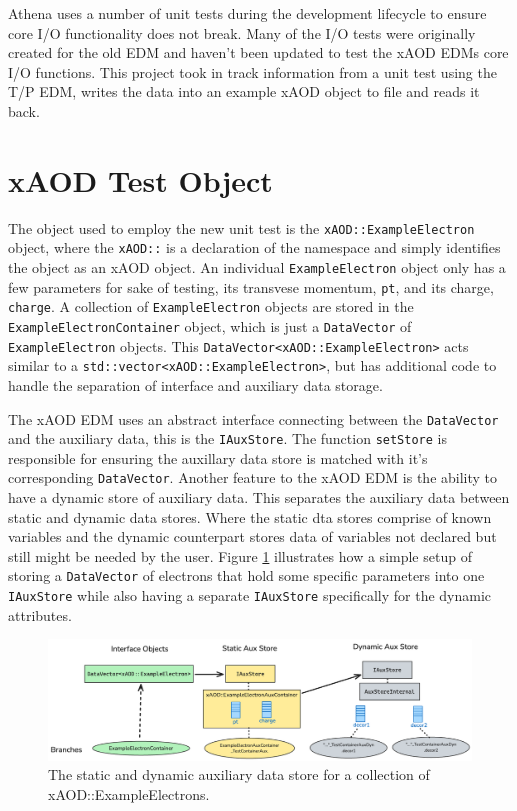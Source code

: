 Athena uses a number of unit tests during the development lifecycle to ensure core I/O functionality does not break.
Many of the I/O tests were originally created for the old EDM and haven't been updated to test the xAOD EDMs core I/O functions.
This project took in track information from a unit test using the T/P EDM, writes the data into an example xAOD object to file and reads it back.


\section{xAOD Test Object}
\label{sec:Mod_utests_xAOD_object}

The object used to employ the new unit test is the \verb|xAOD::ExampleElectron| object, where the \verb|xAOD::| is a declaration of the namespace and simply identifies the object as an xAOD object.
An individual \verb|ExampleElectron| object only has a few parameters for sake of testing, its transvese momentum, \verb|pt|, and its charge, \verb|charge|.
A collection of \verb|ExampleElectron| objects are stored in the \verb|ExampleElectronContainer| object, which is just a \verb|DataVector| of \verb|ExampleElectron| objects.\cite{Buckley_2015}
This \verb|DataVector<xAOD::ExampleElectron>| acts similar to a \verb|std::vector<xAOD::ExampleElectron>|, but has additional code to handle the separation of interface and auxiliary data storage. 

The xAOD EDM uses an abstract interface connecting between the \verb|DataVector| and the auxiliary data, this is the \verb|IAuxStore|. 
The function \verb|setStore| is responsible for ensuring the auxillary data store is matched with it's corresponding \verb|DataVector|.
Another feature to the xAOD EDM is the ability to have a dynamic store of auxiliary data.
This separates the auxiliary data between static and dynamic data stores. 
Where the static dta stores comprise of known variables and the dynamic counterpart stores data of variables not declared but still might be needed by the user. 
Figure \ref{fig:Mod_utests_aux_store} illustrates how a simple setup of storing a \verb|DataVector| of electrons that hold some specific parameters into one \verb|IAuxStore| while also having a separate \verb|IAuxStore| specifically for the dynamic attributes. 

\begin{figure}[h]
    \centering
    \includegraphics[width=\textwidth]{content/img/aux_store_better.png}
    \caption{The static and dynamic auxiliary data store for a collection of xAOD::ExampleElectrons.}
    \label{fig:Mod_utests_aux_store}
\end{figure}





